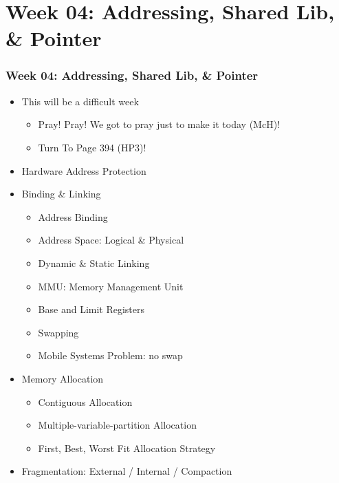 \documentclass[aspectratio=169, xcolor=table, notheorems, hyperref={pdfpagelabels=false}]{beamer}
\begin{document}
\section{Week 04: Addressing, Shared Lib, \& Pointer}
\begin{frame}
\frametitle{Week 04: Addressing, Shared Lib, \& Pointer}
\begin{itemize}
\item This will be a difficult week
\begin{itemize}
\item Pray! Pray! We got to pray just to make it today (McH)!
\item Turn To Page 394 (HP3)!
\end{itemize}
\item Hardware Address Protection
\item Binding \& Linking
\begin{itemize}
\item Address Binding
\item Address Space: Logical \& Physical
\item Dynamic \& Static Linking
\item MMU: Memory Management Unit
\item Base and Limit Registers
\item Swapping
\item Mobile Systems Problem: no swap
\end{itemize}
\item Memory Allocation
\begin{itemize}
\item Contiguous Allocation
\item Multiple-variable-partition Allocation
\item First, Best, Worst Fit Allocation Strategy
\end{itemize}
\item Fragmentation: External / Internal / Compaction
\end{itemize}
\end{frame}

\end{document}

